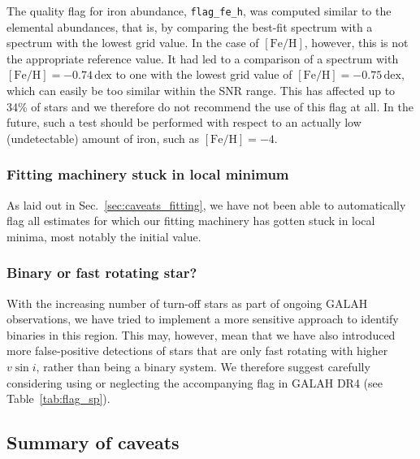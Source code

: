 \documentclass[
  journal=pasa,
  manuscript=research-paper, %
  year=2024,
  volume=37
]{cup-journal}
\newcommand{\feh}{$\mathrm{[Fe/H]}$\xspace}
\newcommand{\vsini}{$v \sin i$\xspace}
\begin{document}
The quality flag for iron abundance, \texttt{flag\_fe\_h}, was computed similar to the elemental abundances, that is, by comparing the best-fit spectrum with a spectrum with the lowest grid value. In the case of \feh, however, this is not the appropriate reference value. It had led to a comparison of a spectrum with $\mathrm{[Fe/H]} = -0.74\,\mathrm{dex}$ to one with the lowest grid value of $\mathrm{[Fe/H]} = -0.75\,\mathrm{dex}$, which can easily be too similar within the SNR range. This has affected up to 34\% of stars and we therefore do not recommend the use of this flag at all. In the future, such a test should be performed with respect to an actually low (undetectable) amount of iron, such as $\mathrm{[Fe/H]} = -4$.

\subsubsection{Fitting machinery stuck in local minimum}

As laid out in Sec.~\ref{sec:caveats_fitting}, we have not been able to automatically flag all estimates for which our fitting machinery has gotten stuck in local minima, most notably the initial value.

\subsubsection{Binary or fast rotating star?}

With the increasing number of turn-off stars as part of ongoing GALAH observations, we have tried to implement a more sensitive approach to identify binaries in this region. This may, however, mean that we have also introduced more false-positive detections of stars that are only fast rotating with higher \vsini, rather than being a binary system. We therefore suggest carefully considering using or neglecting the accompanying flag in GALAH DR4 (see Table~\ref{tab:flag_sp}).

\subsection{Summary of caveats} \label{sec:caveats_summary}
\end{document}
